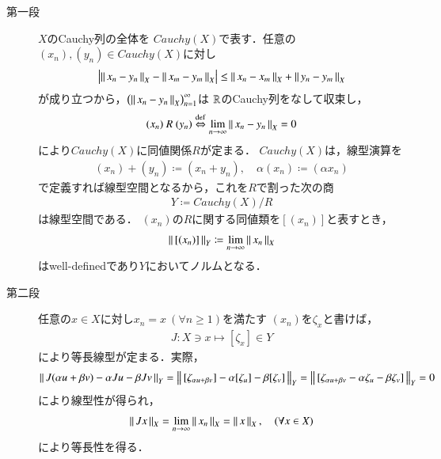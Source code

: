 	\begin{prf}\mbox{}
		\begin{description}
			\item[第一段]
				$X$のCauchy列の全体を
				$Cauchy(X)$で表す．任意の$(x_n),(y_n) \in Cauchy(X)$に対し
				\begin{align}
					\left| \left\|\, x_n - y_n\, \right\|_{X} - \left\|\, x_m - y_m\, \right\|_{X} \right|
					\leq \left\|\, x_n - x_m\, \right\|_{X} + \left\|\, y_n - y_m\, \right\|_{X}
				\end{align}
				が成り立つから，$\left( \left\|\, x_n - y_n\, \right\|_{X} \right)_{n=1}^\infty$は
				$\mathbb{R}$のCauchy列をなして収束し，
				\begin{align}
					(x_n)\ R\ (y_n)
					\overset{\mathrm{def}}{\Leftrightarrow} \lim_{n \to \infty} \left\|\, x_n - y_n\, \right\|_{X} = 0
				\end{align}
				により$Cauchy(X)$に同値関係$R$が定まる．
				$Cauchy(X)$は，線型演算を
				\begin{align}
					(x_n) + (y_n) \coloneqq (x_n + y_n),
					\quad \alpha (x_n) \coloneqq (\alpha x_n)
				\end{align}
				で定義すれば線型空間となるから，これを$R$で割った次の商
				\begin{align}
					Y \coloneqq Cauchy(X) / R
				\end{align}
				は線型空間である．
				$(x_n)$の$R$に関する同値類を$[(x_n)]$と表すとき，
				\begin{align}
					\left\|\, [(x_n)]\, \right\|_{Y} \coloneqq \lim_{n \to \infty} \left\|\, x_n\, \right\|_{X}
				\end{align}
				はwell-definedであり$Y$においてノルムとなる．
			
			\item[第二段]
				任意の$x \in X$に対し$x_n = x\ (\forall n \geq 1)$を満たす
				$(x_n)$を$\zeta_x$と書けば，
				\begin{align}
					J: X \ni x \longmapsto [\zeta_x] \in Y
				\end{align}
				により等長線型が定まる．実際，
				\begin{align}
					\left\|\, J (\alpha u + \beta v) - \alpha J u - \beta J v\, \right\|_{Y}
					= \left\|\, [\zeta_{\alpha u + \beta v}] - \alpha [\zeta_u] - \beta [\zeta_v]\, \right\|_{Y}
					= \left\|\, [\zeta_{\alpha u + \beta v} - \alpha \zeta_u - \beta \zeta_v]\, \right\|_{Y}
					= 0
				\end{align}
				により線型性が得られ，
				\begin{align}
					\left\|\, J x\, \right\|_{X} = \lim_{n \to \infty} \left\|\, x_n\, \right\|_{X}
					= \left\|\, x\, \right\|_{X},
					\quad (\forall x \in X)
				\end{align}
				により等長性を得る．
			

\end{description}
\end{prf}
